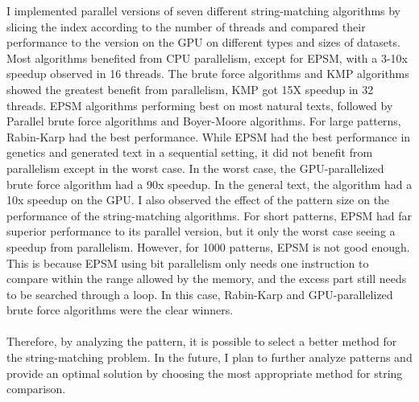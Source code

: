 \documentclass[11pt]{article}       %
\begin{document}
I implemented parallel versions of seven different string-matching algorithms by slicing the index according to the number of threads and compared their performance to the version on the GPU on different types and sizes of datasets. Most algorithms benefited from CPU parallelism, except for EPSM, with a 3-10x speedup observed in 16 threads. The brute force algorithms and KMP algorithms showed the greatest benefit from parallelism, KMP got 15X speedup in 32 threads. EPSM algorithms performing best on most natural texts, followed by Parallel brute force algorithms and Boyer-Moore algorithms. For large patterns, Rabin-Karp had the best performance. While EPSM had the best performance in genetics and generated text in a sequential setting, it did not benefit from parallelism except in the worst case. In the worst case, the GPU-parallelized brute force algorithm had a 90x speedup. In the general text, the algorithm had a 10x speedup on the GPU. I also observed the effect of the pattern size on the performance of the string-matching algorithms. For short patterns, EPSM had far superior performance to its parallel version, but it only the worst case seeing a speedup from parallelism. However, for 1000 patterns, EPSM is not good enough. This is because EPSM using bit parallelism only needs one instruction to compare within the range allowed by the memory, and the excess part still needs to be searched through a loop. In this case, Rabin-Karp and GPU-parallelized brute force algorithms were the clear winners. \\
\\Therefore, by analyzing the pattern, it is possible to select a better method for the string-matching problem. In the future, I plan to further analyze patterns and provide an optimal solution by choosing the most appropriate method for string comparison.
\end{document}
